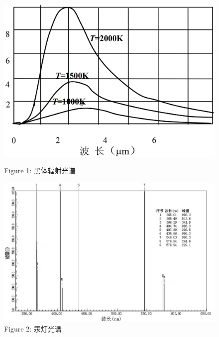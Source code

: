 \documentclass{article}
\begin{document}
\begin{itemize}
          \begin{center}
              \begin{figure}[h]
                  \begin{minipage}{0.45\textwidth}
                      \centering
                      \includegraphics[width=\textwidth]{./pictures/16.png}
                      \caption*{Figure 1: 黑体辐射光谱}
                  \end{minipage}
                  \hfill
                  \begin{minipage}{0.5\textwidth}
                      \centering
                      \includegraphics[width=\textwidth]{./pictures/17.png}
                      \caption*{Figure 2: 汞灯光谱}
                  \end{minipage}
              \end{figure}

\end{center}
\end{itemize}
\end{document}
